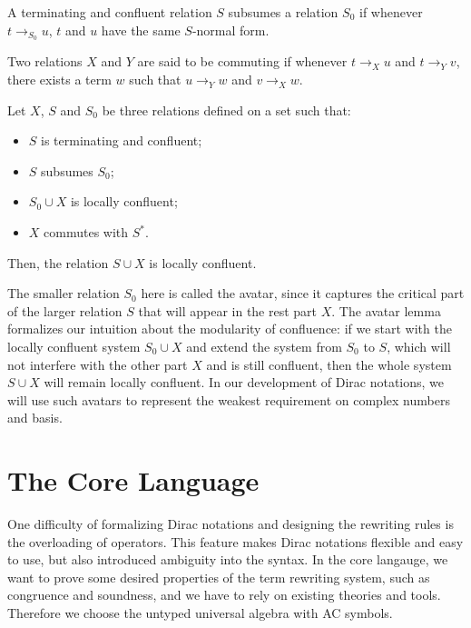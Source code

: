 \documentclass[manuscript, review, timestamp]{acmart}
\begin{document}
\begin{definition}[Subsumption]
  A terminating and confluent relation $S$ subsumes a relation $S_0$ if whenever $t \to_{S_0} u$, $t$ and $u$ have the same $S$-normal form.
\end{definition}

\begin{definition}
  Two relations $X$ and $Y$ are said to be commuting if whenever $t \to_X u$ and $t \to_Y v$, there exists a term $w$ such that $u \to_Y w$ and $v \to_X w$.
\end{definition}

\begin{lemma} \cite{Arrighi2005} Let $X$, $S$ and $S_0$ be three relations defined on a set such that:
  \begin{itemize}
    \item $S$ is terminating and confluent;
    \item $S$ subsumes $S_0$;
    \item $S_0 \cup X$ is locally confluent;
    \item $X$ commutes with $S^*$.
  \end{itemize}
  Then, the relation $S \cup X$ is locally confluent.
\end{lemma}

The smaller relation $S_0$ here is called the avatar, since it captures the critical part of the larger relation $S$ that will appear in the rest part $X$. The avatar lemma formalizes our intuition about the modularity of confluence: if we start with the locally confluent system $S_0 \cup X$ and extend the system from $S_0$ to $S$, which will not interfere with the other part $X$ and is still confluent, then the whole system $S\cup X$ will remain locally confluent. In our development of Dirac notations, we will use such avatars to represent the weakest requirement on complex numbers and basis.


\section{The Core Language}

One difficulty of formalizing Dirac notations and designing the rewriting rules is the overloading of operators. This feature makes Dirac notations flexible and easy to use, but also introduced ambiguity into the syntax. In the core langauge, we want to prove some desired properties of the term rewriting system, such as congruence and soundness, and we have to rely on existing theories and tools. Therefore we choose the untyped universal algebra with AC symbols.
\end{document}
